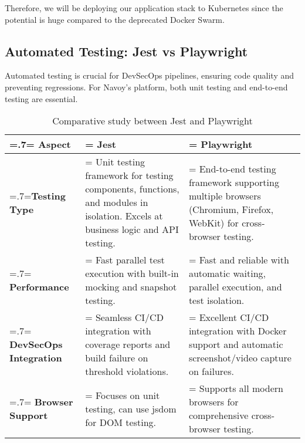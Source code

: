 Therefore, we will be deploying our application stack to Kubernetes since the potential is huge compared to the deprecated Docker Swarm.

\subsection{Automated Testing: Jest vs Playwright}
Automated testing is crucial for DevSecOps pipelines, ensuring code quality and preventing regressions. For Navoy's platform, both unit testing and end-to-end testing are essential.

\begin{table}[H]
    \renewcommand{\arraystretch}{1.5}%
    \caption{Comparative study between Jest and Playwright}
    \centering
    \medskip
    \begin{tabularx}{1\textwidth} {
            | >{\hsize=.7\hsize\linewidth=\hsize\centering\arraybackslash}X
            | >{\hsize=1.15\hsize\linewidth=\hsize\justifying\arraybackslash}X
            | >{\hsize=1.15\hsize\linewidth=\hsize\justifying\arraybackslash}X |}
        \hline
        \rowcolor{primary} \textbf {Aspect} & \textbf {Jest}                                                                                                                          & \textbf {Playwright}                                                                                                       \\
        \hline
        \textbf {Testing Type}              & \noindent Unit testing framework for testing components, functions, and modules in isolation. Excels at business logic and API testing. & \noindent End-to-end testing framework supporting multiple browsers (Chromium, Firefox, WebKit) for cross-browser testing. \\
        \hline
        \textbf {Performance}               & \noindent Fast parallel test execution with built-in mocking and snapshot testing.                                                      & \noindent Fast and reliable with automatic waiting, parallel execution, and test isolation.                                \\
        \hline
        \textbf {DevSecOps Integration}     & \noindent Seamless CI/CD integration with coverage reports and build failure on threshold violations.                                   & \noindent Excellent CI/CD integration with Docker support and automatic screenshot/video capture on failures.              \\
        \hline
        \textbf {Browser Support}           & \noindent Focuses on unit testing, can use jsdom for DOM testing.                                                                       & \noindent Supports all modern browsers for comprehensive cross-browser testing.                                            \\
        \hline
    \end{tabularx}
\end{table}

